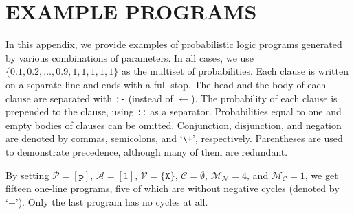 \documentclass[letterpaper]{article}
\theoremstyle{definition}
\newcommand{\predicates}{\mathcal{P}}
\newcommand{\variables}{\mathcal{V}}
\newcommand{\constants}{\mathcal{C}}
\newcommand{\arities}{\mathcal{A}}
\newcommand{\maxNumNodes}{\mathcal{M}_{\mathcal{N}}}
\newcommand{\maxNumClauses}{\mathcal{M}_{\mathcal{C}}}
\begin{document}


\renewcommand{\bibsection}{\subsubsection*{References}}


\appendix
\section{EXAMPLE PROGRAMS}

In this appendix, we provide examples of probabilistic logic programs generated
by various combinations of parameters. In all cases, we use $\{ 0.1, 0.2, \dots,
0.9, 1, 1, 1, 1, 1\}$ as the multiset of probabilities. Each clause is written
on a separate line and ends with a full stop. The head and the body of each
clause are separated with \texttt{:-} (instead of $\gets$). The probability of
each clause is prepended to the clause, using \texttt{::} as a separator.
Probabilities equal to one and empty bodies of clauses can be omitted.
Conjunction, disjunction, and negation are denoted by commas, semicolons, and
`\texttt{\textbackslash+}', respectively. Parentheses are used to demonstrate
precedence, although many of them are redundant. 

By setting $\predicates{} = [\texttt{p}]$, $\arities{} = [1]$, $\variables{} =
\{ \texttt{X} \}$, $\constants{} = \emptyset$, $\maxNumNodes{} = 4$, and
$\maxNumClauses{} = 1$, we get fifteen one-line programs, five of which are
without negative cycles (denoted by `+'). Only the last program has no cycles at
all.
\end{document}
